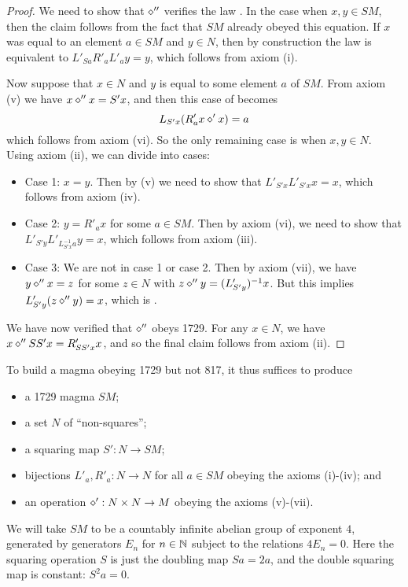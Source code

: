 \begin{proof}  We need to show that $\diamond''$ verifies the law .  In the case when $x,y \in SM$, then the claim follows from the fact that $SM$ already obeyed this equation.  If $x$ was equal to an element $a \in SM$ and $y \in N$, then by construction the law is equivalent to $L'_{Sa} R'_a L'_a y = y$, which follows from axiom (i).

Now suppose that $x \in N$ and $y$ is equal to some element $a$ of $SM$.  From axiom (v) we have $x \diamond'' x = S'x$, and then this case of  becomes
$$L_{S'x} ( R'_a x \diamond' x ) = a$$
which follows from axiom (vi).  So the only remaining case is when $x,y \in N$.  Using axiom (ii), we can divide into cases:
\begin{itemize}
\item Case 1: $x=y$.  Then by (v) we need to show that $L'_{S'x} L'_{S'x} x = x$, which follows from axiom (iv).
\item Case 2: $y = R'_a x$ for some $a \in SM$.  Then by axiom (vi), we need to show that $L'_{S'y} L'_{L_{S'x}^{-1} a} y = x$, which follows from axiom (iii).
\item Case 3: We are not in case 1 or case 2.  Then by axiom (vii), we have $y \diamond'' x = z$ for some $z \in N$ with $z \diamond'' y = (L'_{S'y})^{-1} x$.  But this implies $L'_{S'y} (z \diamond'' y) = x$, which is .
\end{itemize}

We have now verified that $\diamond''$ obeys 1729.  For any $x \in N$, we have $x \diamond'' SS' x = R'_{SS' x} x$, and so the final claim follows from axiom (ii).
\end{proof}

To build a magma obeying 1729 but not 817, it thus suffices to produce
\begin{itemize}
  \item a 1729 magma $SM$;
  \item a set $N$ of ``non-squares'';
  \item a squaring map $S': N \to SM$;
  \item bijections $L'_a, R'_a: N \to N$ for all $a \in SM$ obeying the axioms (i)-(iv); and
  \item an operation $\diamond': N \times N \to M$ obeying the axioms (v)-(vii).
\end{itemize}

We will take $SM$ to be a countably infinite abelian group of exponent $4$, generated by generators $E_n$ for $n \in \mathbb{N}$ subject to the relations $4E_n=0$.   Here the squaring operation $S$ is just the doubling map $Sa = 2a$, and the double squaring map is constant: $S^2 a = 0$.


